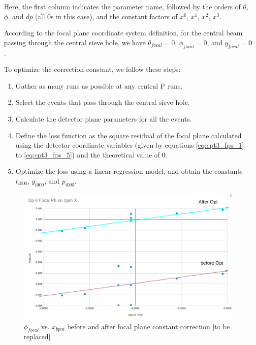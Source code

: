 Here, the first column indicates the parameter name, followed by the orders of $\theta$, $\phi$, and $dp$ (all 0s in this case), and the constant factors of $x^0$, $x^1$, $x^2$, $x^3$.

According to the focal plane coordinate system definition, for the central beam passing through the central sieve hole, we have $\theta_{focal}=0$, $\phi_{focal}=0$, and $y_{focal}=0$.

To optimize the correction constant, we follow these steps:

\begin{enumerate}
    \item Gather as many runs as possible at any central P runs.
    \item Select the events that pass through the central sieve hole.
    \item Calculate the detector plane parameters for all the events.
    \item Define the loss function as the square residual of the focal plane calculated using the detector coordinate variables (given by equations \ref{eq:cpt3_fps_1} to \ref{eq:cpt3_fps_5}) and the theoretical value of 0.
    \item Optimize the loss using a linear regression model, and obtain the constants $t_{i000}$, $y_{i000}$, and $p_{i000}$.
\end{enumerate}


\begin{figure}
    \centering
    \includegraphics[width =\textwidth]{images/chap4/vdcconstant_focal_bpmx.png}
    \caption{$\phi_{focal}$ vs. $x_{bpm}$ before and after focal plane constant correction [to be replaced]}
    \label{fig:focal_ph_bpm_x_constant_correction_plt}
\end{figure}


